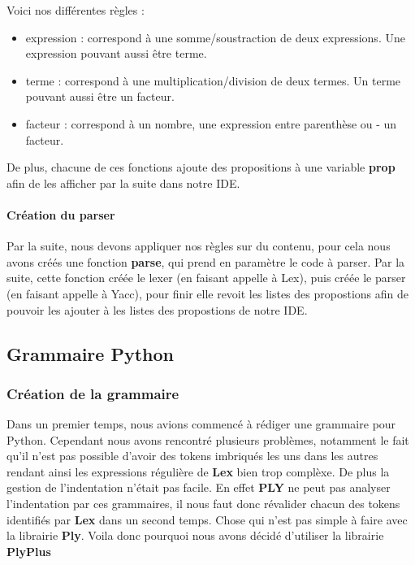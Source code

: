 \documentclass[a4paper,12pt]{article}
\begin{document}
				Voici nos différentes règles : 
				\begin{itemize}
					\item expression : correspond à une somme/soustraction de deux expressions. Une expression pouvant aussi être terme.
					\item terme : correspond à une multiplication/division de deux termes. Un terme pouvant aussi être un facteur.
					\item facteur : correspond à un nombre, une expression entre parenthèse ou - un facteur.
				\end{itemize}

				De plus, chacune de ces fonctions ajoute des propositions à une variable \textbf{prop} afin de les afficher par la suite dans notre IDE.

			\paragraph{Création du parser}

				Par la suite, nous devons appliquer nos règles sur du contenu, pour cela nous avons créés une fonction \textbf{parse}, qui prend en paramètre le code à parser. Par la suite, cette fonction créée le lexer (en faisant appelle à Lex), puis créée le parser (en faisant appelle à Yacc), pour finir elle revoit les listes des propostions afin de pouvoir les ajouter à les listes des propostions de notre IDE.
	
	\subsection{Grammaire Python}

		\subsubsection{Création de la grammaire}

			Dans un premier temps, nous avions commencé à rédiger une grammaire pour Python. Cependant nous avons rencontré plusieurs problèmes, notamment le fait qu'il n'est pas possible d'avoir des tokens imbriqués les uns dans les autres rendant ainsi les expressions régulière de \textbf{Lex} bien trop complèxe. De plus la gestion de l'indentation n'était pas facile. En effet \textbf{PLY} ne peut pas analyser l'indentation par ces grammaires, il nous faut donc révalider chacun des tokens identifiés par \textbf{Lex} dans un second temps. Chose qui n'est pas simple à faire avec la librairie \textbf{Ply}. Voila donc pourquoi nous avons décidé d'utiliser la librairie \textbf{PlyPlus}
\end{document}
